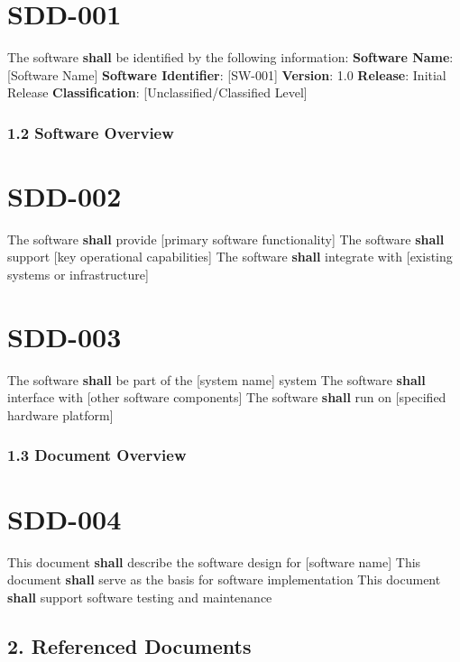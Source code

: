 \section{SDD-001}\label{SDD-001}

The software \textbf{shall} be identified by the following information:
\textbf{Software Name}: [Software Name]
\textbf{Software Identifier}: [SW-001]
\textbf{Version}: 1.0
\textbf{Release}: Initial Release
\textbf{Classification}: [Unclassified/Classified Level]

\subsubsection{1.2 Software Overview}

\section{SDD-002}\label{SDD-002}

The software \textbf{shall} provide [primary software functionality]
The software \textbf{shall} support [key operational capabilities]
The software \textbf{shall} integrate with [existing systems or infrastructure]

\section{SDD-003}\label{SDD-003}

The software \textbf{shall} be part of the [system name] system
The software \textbf{shall} interface with [other software components]
The software \textbf{shall} run on [specified hardware platform]

\subsubsection{1.3 Document Overview}

\section{SDD-004}\label{SDD-004}

This document \textbf{shall} describe the software design for [software name]
This document \textbf{shall} serve as the basis for software implementation
This document \textbf{shall} support software testing and maintenance

\subsection{2. Referenced Documents}

